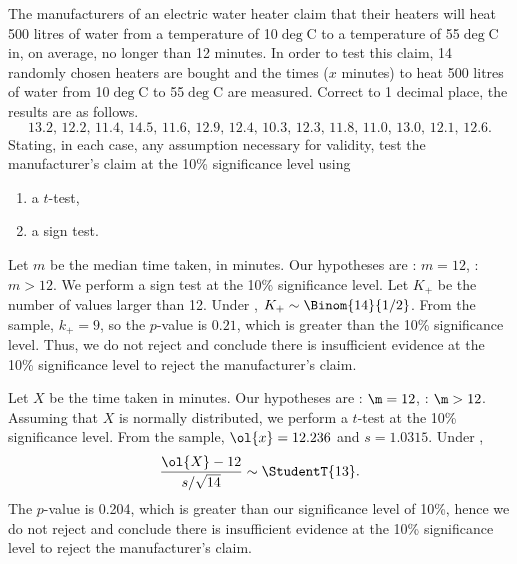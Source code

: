 \begin{problem}
    The manufacturers of an electric water heater claim that their heaters will heat 500 litres of water from a temperature of 10$\deg$C to a temperature of 55$\deg$C in, on average, no longer than 12 minutes. In order to test this claim, 14 randomly chosen heaters are bought and the times ($x$ minutes) to heat 500 litres of water from 10$\deg$C to 55$\deg$C are measured. Correct to 1 decimal place, the results are as follows. \[13.2, \, 12.2, \, 11.4, \, 14.5, \, 11.6, \, 12.9, \, 12.4, \, 10.3, \, 12.3, \, 11.8, \, 11.0, \, 13.0, \, 12.1, \, 12.6.\] Stating, in each case, any assumption necessary for validity, test the manufacturer's claim at the 10\% significance level using
    \begin{enumerate}
        \item a $t$-test,
        \item a sign test.
    \end{enumerate}
\end{problem}
\begin{solution}
    \begin{ppart}
        Let $m$ be the median time taken, in minutes. Our hypotheses are \nullhyp: $m = 12$, \althyp: $m > 12$. We perform a sign test at the 10\% significance level. Let $K_+$ be the number of values larger than 12. Under \nullhyp, $K_+ \sim \Binom{14}{1/2}$. From the sample, $k_+ = 9$, so the $p$-value is $0.21$, which is greater than the 10\% significance level. Thus, we do not reject \nullhyp{} and conclude there is insufficient evidence at the 10\% significance level to reject the manufacturer's claim.
    \end{ppart}
    \begin{ppart}
        Let $X$ be the time taken in minutes. Our hypotheses are \nullhyp: $\m = 12$, \althyp: $\m > 12$. Assuming that $X$ is normally distributed, we perform a $t$-test at the 10\% significance level. From the sample, $\ol{x} = 12.236$ and $s = 1.0315$. Under \nullhyp, \[\frac{\ol{X} - 12}{s / \sqrt{14}} \sim \StudentT{13}.\] The $p$-value is 0.204, which is greater than our significance level of 10\%, hence we do not reject \nullhyp{} and conclude there is insufficient evidence at the 10\% significance level to reject the manufacturer's claim.
    \end{ppart}
\end{solution}

